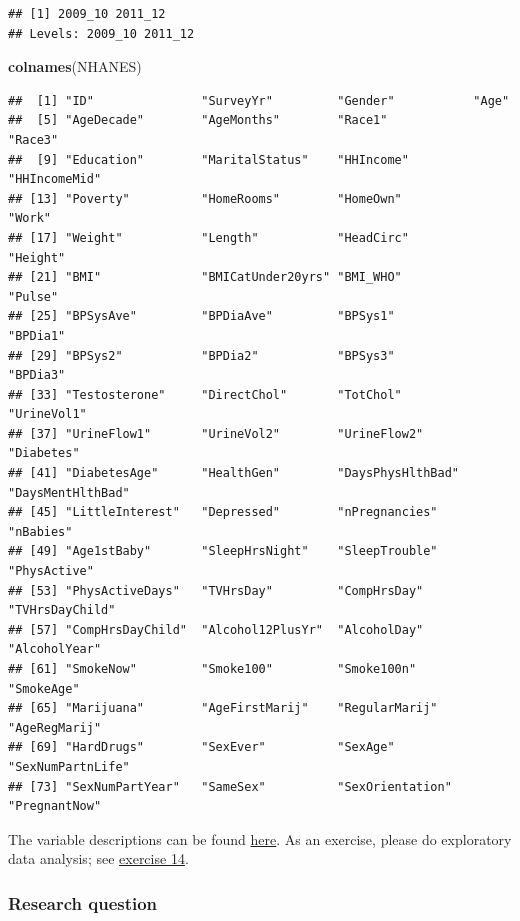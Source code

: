 \documentclass[
]{book}
\newenvironment{Shaded}{\begin{snugshade}}{\end{snugshade}}
\newcommand{\FunctionTok}[1]{\textcolor[rgb]{0.13,0.29,0.53}{\textbf{#1}}}
\newcommand{\NormalTok}[1]{#1}
\begin{document}
\begin{verbatim}
## [1] 2009_10 2011_12
## Levels: 2009_10 2011_12
\end{verbatim}

\begin{Shaded}
\begin{Highlighting}[]
\FunctionTok{colnames}\NormalTok{(NHANES)}
\end{Highlighting}
\end{Shaded}

\begin{verbatim}
##  [1] "ID"               "SurveyYr"         "Gender"           "Age"             
##  [5] "AgeDecade"        "AgeMonths"        "Race1"            "Race3"           
##  [9] "Education"        "MaritalStatus"    "HHIncome"         "HHIncomeMid"     
## [13] "Poverty"          "HomeRooms"        "HomeOwn"          "Work"            
## [17] "Weight"           "Length"           "HeadCirc"         "Height"          
## [21] "BMI"              "BMICatUnder20yrs" "BMI_WHO"          "Pulse"           
## [25] "BPSysAve"         "BPDiaAve"         "BPSys1"           "BPDia1"          
## [29] "BPSys2"           "BPDia2"           "BPSys3"           "BPDia3"          
## [33] "Testosterone"     "DirectChol"       "TotChol"          "UrineVol1"       
## [37] "UrineFlow1"       "UrineVol2"        "UrineFlow2"       "Diabetes"        
## [41] "DiabetesAge"      "HealthGen"        "DaysPhysHlthBad"  "DaysMentHlthBad" 
## [45] "LittleInterest"   "Depressed"        "nPregnancies"     "nBabies"         
## [49] "Age1stBaby"       "SleepHrsNight"    "SleepTrouble"     "PhysActive"      
## [53] "PhysActiveDays"   "TVHrsDay"         "CompHrsDay"       "TVHrsDayChild"   
## [57] "CompHrsDayChild"  "Alcohol12PlusYr"  "AlcoholDay"       "AlcoholYear"     
## [61] "SmokeNow"         "Smoke100"         "Smoke100n"        "SmokeAge"        
## [65] "Marijuana"        "AgeFirstMarij"    "RegularMarij"     "AgeRegMarij"     
## [69] "HardDrugs"        "SexEver"          "SexAge"           "SexNumPartnLife" 
## [73] "SexNumPartYear"   "SameSex"          "SexOrientation"   "PregnantNow"
\end{verbatim}

The variable descriptions can be found
\href{https://cran.r-project.org/web/packages/NHANES/NHANES.pdf}{here}.
As an exercise, please do exploratory data analysis;
see \hyperref[exercise14_multiple_regression]{exercise 14}.

\subsubsection{Research question}\label{research-question}
\end{document}

